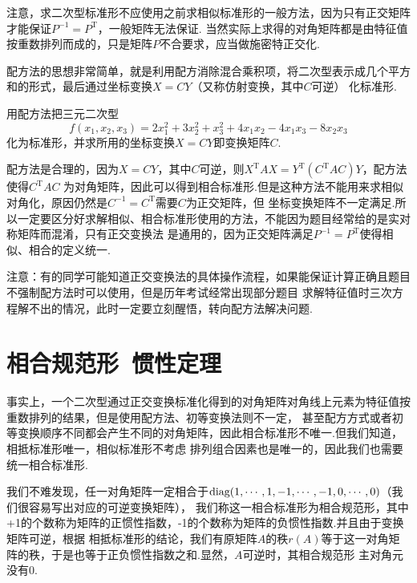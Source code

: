 注意，求二次型标准形不应使用之前求相似标准形的一般方法，因为只有正交矩阵才能保证$P^{-1}=P^\mathrm{T}$，一般矩阵无法保证.
当然实际上求得的对角矩阵都是由特征值按重数排列而成的，只是矩阵$P$不合要求，应当做施密特正交化.

配方法的思想非常简单，就是利用配方消除混合乘积项，将二次型表示成几个平方和的形式，最后通过坐标变换$X=CY$（又称仿射变换，其中$C$可逆）
化标准形.
\begin{example}
	用配方法把三元二次型
	$$f(x_1,x_2,x_3)=2x_1^2+3x_2^2+x_3^2+4x_1x_2-4x_1x_3-8x_2x_3$$
	化为标准形，并求所用的坐标变换$X=CY$即变换矩阵$C$.
\end{example}
配方法是合理的，因为$X=CY$，其中$C$可逆，则$X^\mathrm{T}AX=Y^\mathrm{T}(C^\mathrm{T}AC)Y$，配方法使得$C^\mathrm{T}AC$
为对角矩阵，因此可以得到相合标准形.但是这种方法不能用来求相似对角化，原因仍然是$C^{-1}=C^\mathrm{T}$需要$C$为正交矩阵，但
坐标变换矩阵不一定满足.所以一定要区分好求解相似、相合标准形使用的方法，不能因为题目经常给的是实对称矩阵而混淆，只有正交变换法
是通用的，因为正交矩阵满足$P^{-1}=P^\mathrm{T}$使得相似、相合的定义统一.

注意：有的同学可能知道正交变换法的具体操作流程，如果能保证计算正确且题目不强制配方法时可以使用，但是历年考试经常出现部分题目
求解特征值时三次方程解不出的情况，此时一定要立刻醒悟，转向配方法解决问题.

\section{相合规范形\ 惯性定理}
事实上，一个二次型通过正交变换标准化得到的对角矩阵对角线上元素为特征值按重数排列的结果，但是使用配方法、初等变换法则不一定，
甚至配方方式或者初等变换顺序不同都会产生不同的对角矩阵，因此相合标准形不唯一.但我们知道，相抵标准形唯一，相似标准形不考虑
排列组合因素也是唯一的，因此我们也需要统一相合标准形.

我们不难发现，任一对角矩阵一定相合于$\textup{diag}(1,\cdots,1,-1,\cdots,-1,0,\cdots,0)$（我们很容易写出对应的可逆变换矩阵），
我们称这一相合标准形为相合规范形，其中+1的个数称为矩阵的正惯性指数，-1的个数称为矩阵的负惯性指数.并且由于变换矩阵可逆，根据
相抵标准形的结论，我们有原矩阵$A$的秩$r(A)$等于这一对角矩阵的秩，于是也等于正负惯性指数之和.显然，$A$可逆时，其相合规范形
主对角元没有0.

